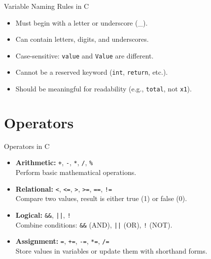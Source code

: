\documentclass[12pt, aspectratio=169]{beamer}
\begin{document}
    \begin{frame}{Variable Naming Rules in C}
        \begin{itemize}
            \item Must begin with a letter or underscore (\_).
            \item Can contain letters, digits, and underscores.
            \item Case-sensitive: \texttt{value} and \texttt{Value} are different.
            \item Cannot be a reserved keyword (\texttt{int}, \texttt{return}, etc.).
            \item Should be meaningful for readability (e.g., \texttt{total}, not \texttt{x1}).
        \end{itemize}
    \end{frame}


    \section{Operators}

    \begin{frame}{Operators in C}
        \begin{itemize}
            \item \textbf{Arithmetic:} \texttt{+}, \texttt{-}, \texttt{*}, \texttt{/}, \texttt{\%} \\
                Perform basic mathematical operations.
            \item \textbf{Relational:} \texttt{<}, \texttt{<=}, \texttt{>}, \texttt{>=}, \texttt{==}, \texttt{!=} \\
                Compare two values, result is either true (1) or false (0).
            \item \textbf{Logical:} \texttt{\&\&}, \texttt{||}, \texttt{!} \\
                Combine conditions: \texttt{\&\&} (AND), \texttt{||} (OR), \texttt{!} (NOT).
            \item \textbf{Assignment:} \texttt{=}, \texttt{+=}, \texttt{-=}, \texttt{*=}, \texttt{/=} \\
                Store values in variables or update them with shorthand forms.
        \end{itemize}
    \end{frame}
\end{document}
